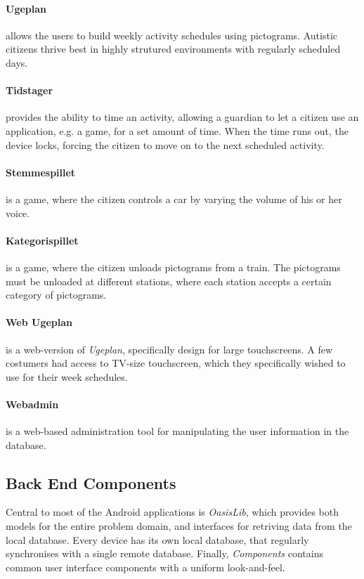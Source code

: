 \paragraph{Ugeplan}
allows the users to build weekly activity schedules using pictograms. Autistic citizens thrive best in highly strutured environments with regularly scheduled days.

\paragraph{Tidstager}
provides the ability to time an activity, allowing a guardian to let a citizen use an application, e.g. a game, for a set amount of time. When the time runs out, the device locks, forcing the citizen to move on to the next scheduled activity.

\paragraph{Stemmespillet}
is a game, where the citizen controls a car by varying the volume of his or her voice. 

\paragraph{Kategorispillet}
is a game, where the citizen unloads pictograms from a train. The pictograms must be unloaded at different stations, where each station accepts a certain category of pictograms.

\paragraph{Web Ugeplan}
is a web-version of \textit{Ugeplan}, specifically design for large touchscreens. A few costumers had access to TV-size touchscreen, which they specifically wished to use for their week schedules.

\paragraph{Webadmin}
is a web-based administration tool for manipulating the user information in the database.

\subsection{Back End Components}
\label{sec:giraf:applications:backend}
Central to most of the Android applications is \textit{OasisLib}, which provides both models for the entire problem domain, and interfaces for retriving data from the local database. Every device has its own local database, that regularly synchronises with a single remote database. Finally, \textit{\giraf Components} contains common user interface components with a uniform look-and-feel. 


